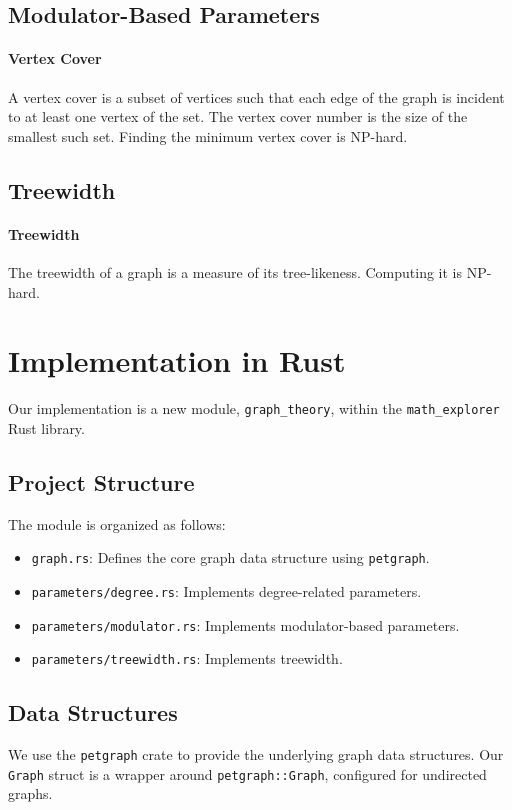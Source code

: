 \documentclass{article}
\begin{document}
\subsection{Modulator-Based Parameters}
\paragraph{Vertex Cover} A vertex cover is a subset of vertices such that each edge of the graph is incident to at least one vertex of the set. The vertex cover number is the size of the smallest such set. Finding the minimum vertex cover is NP-hard.

\subsection{Treewidth}
\paragraph{Treewidth} The treewidth of a graph is a measure of its tree-likeness. Computing it is NP-hard.

\section{Implementation in Rust}
Our implementation is a new module, \texttt{graph_theory}, within the \texttt{math_explorer} Rust library.

\subsection{Project Structure}
The module is organized as follows:
\begin{itemize}
    \item \texttt{graph.rs}: Defines the core graph data structure using \texttt{petgraph}.
    \item \texttt{parameters/degree.rs}: Implements degree-related parameters.
    \item \texttt{parameters/modulator.rs}: Implements modulator-based parameters.
    \item \texttt{parameters/treewidth.rs}: Implements treewidth.
\end{itemize}

\subsection{Data Structures}
We use the \texttt{petgraph} crate to provide the underlying graph data structures. Our \texttt{Graph} struct is a wrapper around \texttt{petgraph::Graph}, configured for undirected graphs.
\end{document}
